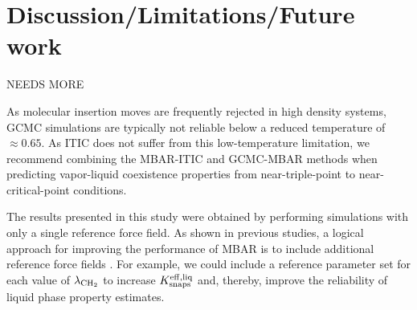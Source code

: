 \documentclass[journal=jced,manuscript=article]{achemso}
\begin{document}

\section{Discussion/Limitations/Future work} \label{sec: Discussion}

NEEDS MORE

As molecular insertion moves are frequently rejected in high density systems, GCMC simulations are typically not reliable below a reduced temperature of $\approx 0.65$. As ITIC does not suffer from this low-temperature limitation, we recommend combining the MBAR-ITIC and GCMC-MBAR methods when predicting vapor-liquid coexistence properties from near-triple-point to near-critical-point conditions.

The results presented in this study were obtained by performing simulations with only a single reference force field. As shown in previous studies, a logical approach for improving the performance of MBAR is to include additional reference force fields \cite{Postdoc_1,Postdoc_2}. For example, we could include a reference parameter set for each value of $\lambda_{\rm CH_2}$ to increase $K_{\rm snaps}^{\rm eff, liq}$ and, thereby, improve the reliability of liquid phase property estimates.
\end{document}
